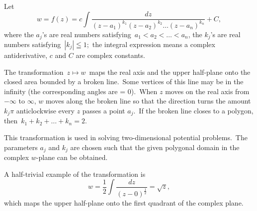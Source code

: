\documentclass[12pt]{article}
\begin{document}
Let
$$w = f(z) = c\int\frac{dz}{(z-a_1)^{k_1}(z-a_2)^{k_2}\ldots(z-a_n)^{k_n}}+C,$$
where the $a_j$'s are real numbers satisfying\, $a_1 < a_2 < \ldots < a_n$, the $k_j$'s are real numbers satisfying\, $|k_j| \leqq 1$;\, the integral expression means a complex antiderivative, $c$ and $C$ are complex constants.

The transformation\, $z \mapsto w$\, maps the real axis and the upper half-plane  onto the closed area bounded by a broken line.\, Some vertices of this line may be in the infinity (the corresponding angles are = 0).\, When $z$ moves on the real axis from $-\infty$ to $\infty$, $w$ moves along the broken line so that the direction turns the amount $k_j\pi$ anticlockwise every  $z$ passes a point $a_j$.\, If the broken line closes to a polygon, then\, 
$k_1\!+\!k_2\!+\!\ldots\!+\!k_n = 2$.

This transformation is used in solving two-dimensional potential problems.\, The parameters $a_j$ and $k_j$ are chosen such that the given polygonal domain in the complex $w$-plane can be obtained.

A half-trivial example of the transformation is
$$w = \frac{1}{2}\int\frac{dz}{(z-0)^{\frac{1}{2}}} = \sqrt{z},$$
which maps the upper half-plane onto the first quadrant of the complex plane.
\end{document}

